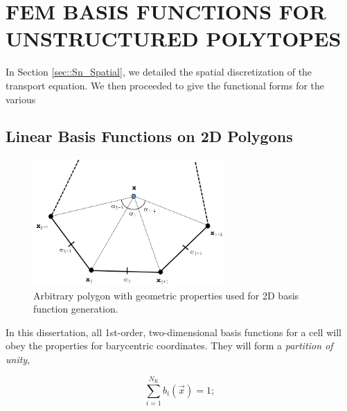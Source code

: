 %
%
%
\chapter{\uppercase {FEM Basis Functions for Unstructured Polytopes}}
\label{sec::BF}

In Section \ref{sec::Sn_Spatial}, we detailed the spatial discretization of the transport equation. We then proceeded to give the functional forms for the various 

\section{Linear Basis Functions on 2D Polygons}
\label{sec::BF_2DLinear}



\begin{figure}[hbt]
\centering
\includegraphics[width=0.65\textwidth]{figures/sec_BF/ref_polygon.png}
\caption{Arbitrary polygon with geometric properties used for 2D basis function generation.}
\label{fig::BF_2D_ref_polygon}
\end{figure}

In this dissertation, all 1st-order, two-dimensional basis functions for a cell will obey the properties for barycentric coordinates. They will form a {\em partition of unity},

\begin{equation}
\sum_{i=1}^{N_K} b_i (\vec{x})  =  1;
\label{eq::BF_linear_interp_partition}
\end{equation}

